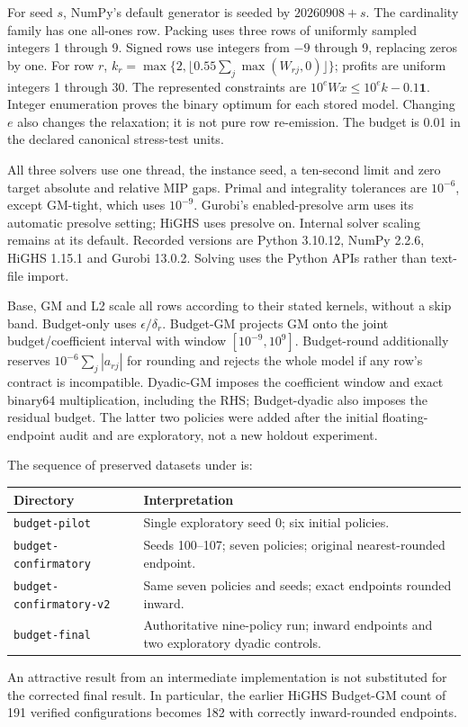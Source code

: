 \documentclass[11pt]{article}
\begin{document}
For seed $s$, NumPy's default generator is seeded by $20260908+s$. The cardinality
family has one all-ones row. Packing uses three rows of uniformly sampled integers
1 through 9. Signed rows use integers from $-9$ through 9, replacing zeros by one.
For row $r$, $k_r=\max\{2,\lfloor0.55\sum_j\max(W_{rj},0)\rfloor\}$; profits
are uniform integers 1 through 30. The represented constraints are
$10^e Wx\le10^e k-0.1\boldsymbol1$. Integer enumeration proves the binary optimum
for each stored model. Changing $e$ also changes the relaxation; it is not pure
row re-emission. The budget is 0.01 in the declared canonical stress-test units.

All three solvers use one thread, the instance seed, a ten-second limit and zero target
absolute and relative MIP gaps. Primal and integrality tolerances are $10^{-6}$,
except GM-tight, which uses $10^{-9}$. Gurobi's enabled-presolve arm uses its automatic
presolve setting; HiGHS uses presolve on. Internal solver scaling remains at its
default. Recorded versions are Python 3.10.12, NumPy 2.2.6, HiGHS 1.15.1 and
Gurobi 13.0.2. Solving uses the Python APIs rather than text-file import.

Base, GM and L2 scale all rows according to their stated kernels, without a skip
band. Budget-only uses $\epsilon/\delta_r$. Budget-GM projects GM onto the joint
budget/coefficient interval with window $[10^{-9},10^9]$. Budget-round additionally
reserves $10^{-6}\sum_j|a_{rj}|$ for rounding and rejects the whole model if any
row's contract is incompatible. Dyadic-GM imposes the coefficient window and exact
binary64 multiplication, including the RHS; Budget-dyadic also imposes the residual
budget. The latter two policies were added after the initial floating-endpoint audit
and are exploratory, not a new holdout experiment.

The sequence of preserved datasets under
 is:
\begin{center}\small
\begin{tabularx}{\linewidth}{lX}
\toprule
Directory & Interpretation\\
\midrule
\texttt{budget-pilot} & Single exploratory seed 0; six initial policies.\\
\texttt{budget-confirmatory} & Seeds 100--107; seven policies; original nearest-rounded endpoint.\\
\texttt{budget-confirmatory-v2} & Same seven policies and seeds; exact endpoints rounded inward.\\
\texttt{budget-final} & Authoritative nine-policy run; inward endpoints and two exploratory dyadic controls.\\
\bottomrule
\end{tabularx}
\end{center}
An attractive result from an intermediate implementation is not substituted for the
corrected final result. In particular, the earlier HiGHS Budget-GM count of 191
verified configurations becomes 182 with correctly inward-rounded endpoints.
\end{document}
